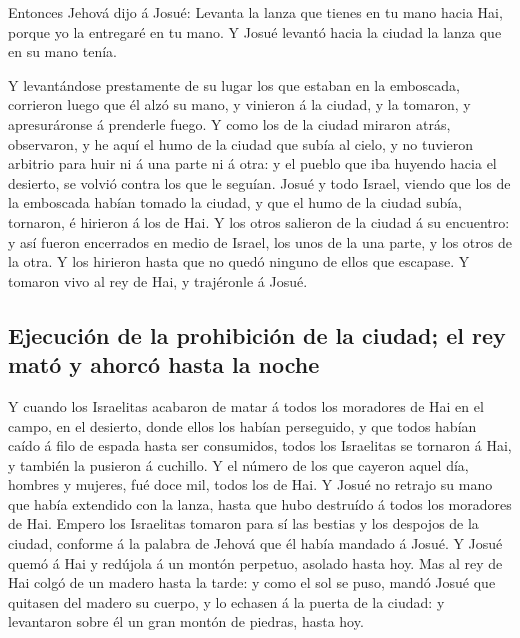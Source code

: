  Entonces Jehová dijo á Josué: Levanta la lanza que tienes
en tu mano hacia Hai, porque yo la entregaré en tu mano. Y Josué levantó
hacia la ciudad la lanza que en su mano tenía.

 Y levantándose prestamente de su lugar los que estaban en
la emboscada, corrieron luego que él alzó su mano, y vinieron á la
ciudad, y la tomaron, y apresuráronse á prenderle fuego.  Y
como los de la ciudad miraron atrás, observaron, y he aquí el humo de la
ciudad que subía al cielo, y no tuvieron arbitrio para huir ni á una
parte ni á otra: y el pueblo que iba huyendo hacia el desierto, se
volvió contra los que le seguían.  Josué y todo Israel,
viendo que los de la emboscada habían tomado la ciudad, y que el humo de
la ciudad subía, tornaron, é hirieron á los de Hai.  Y los
otros salieron de la ciudad á su encuentro: y así fueron encerrados en
medio de Israel, los unos de la una parte, y los otros de la otra. Y los
hirieron hasta que no quedó ninguno de ellos que escapase. 
Y tomaron vivo al rey de Hai, y trajéronle á Josué.

\hypertarget{ejecuciuxf3n-de-la-prohibiciuxf3n-de-la-ciudad-el-rey-matuxf3-y-ahorcuxf3-hasta-la-noche}{%
\subsection{Ejecución de la prohibición de la ciudad; el rey mató y
ahorcó hasta la
noche}\label{ejecuciuxf3n-de-la-prohibiciuxf3n-de-la-ciudad-el-rey-matuxf3-y-ahorcuxf3-hasta-la-noche}}

 Y cuando los Israelitas acabaron de matar á todos los
moradores de Hai en el campo, en el desierto, donde ellos los habían
perseguido, y que todos habían caído á filo de espada hasta ser
consumidos, todos los Israelitas se tornaron á Hai, y también la
pusieron á cuchillo.  Y el número de los que cayeron aquel
día, hombres y mujeres, fué doce mil, todos los de Hai.  Y
Josué no retrajo su mano que había extendido con la lanza, hasta que
hubo destruído á todos los moradores de Hai.  Empero los
Israelitas tomaron para sí las bestias y los despojos de la ciudad,
conforme á la palabra de Jehová que él había mandado á Josué.
 Y Josué quemó á Hai y redújola á un montón perpetuo,
asolado hasta hoy.  Mas al rey de Hai colgó de un madero
hasta la tarde: y como el sol se puso, mandó Josué que quitasen del
madero su cuerpo, y lo echasen á la puerta de la ciudad: y levantaron
sobre él un gran montón de piedras, hasta hoy.

